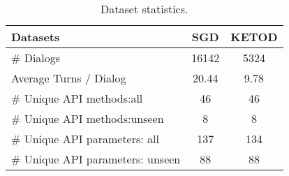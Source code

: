 \begin{table}
    \centering
    \small
    \begin{adjustbox}{max width=0.49\textwidth}
        \begin{tabular}{lcc}
            \hline
            Datasets & \textbf{SGD} & \textbf{KETOD} \\ %
            \hline
            \# Dialogs & 16142  & 5324 \\ %
            Average Turns / Dialog & 20.44   & 9.78 \\ %
            \# Unique API methods:all & 46  & 46 \\ 
            \# Unique API methods:unseen  & 8  & 8 \\ 
            \# Unique API parameters: all& 137 & 134 \\
            \# Unique API parameters: unseen & 88 & 88 \\
            \hline
            
        \end{tabular}
    \end{adjustbox}
    \vspace{-8pt}
    \caption{Dataset statistics.}
    \label{tab:data_statistics}
    \vspace{-20pt}
\end{table}

